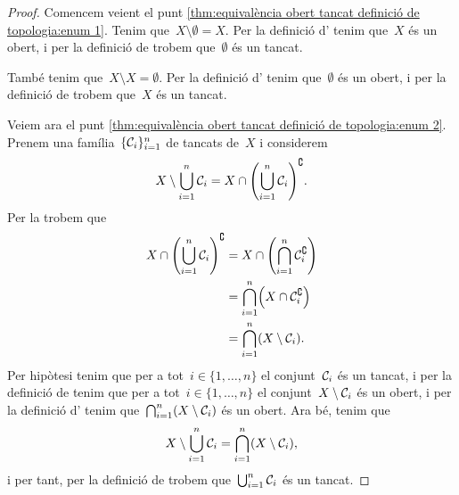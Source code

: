 \documentclass[../../main.tex]{subfiles}
\begin{document}
    \begin{proof}
        Comencem veient el punt \eqref{thm:equivalència obert tancat definició de topologia:enum 1}.
        Tenim que~\(X\setminus\emptyset=X\).
        Per la definició d' tenim que~\(X\) és un obert, i per la definició de  trobem que~\(\emptyset\) és un tancat.

        També tenim que~\(X\setminus X=\emptyset\).
        Per la definició d' tenim que~\(\emptyset\) és un obert, i per la definició de  trobem que~\(X\) és un tancat.

        Veiem ara el punt \eqref{thm:equivalència obert tancat definició de topologia:enum 2}.
        Prenem una família~\(\{\mathcal{C}_{i}\}_{i=1}^{n}\) de tancats de~\(X\) i considerem
        \[
            X\setminus\bigcup_{i=1}^{n}\tancat{C}_{i}=X\cap\left(\bigcup_{i=1}^{n}\tancat{C}_{i}\right)^{\complement}.
        \]
        Per la  trobem que
        \begin{align*}
            X\cap\left(\bigcup_{i=1}^{n}\tancat{C}_{i}\right)^{\complement}&=X\cap\left(\bigcap_{i=1}^{n}\tancat{C}_{i}^{\complement}\right) \\
            &=\bigcap_{i=1}^{n}\left(X\cap\tancat{C}_{i}^{\complement}\right) \\
            &=\bigcap_{i=1}^{n}\left(X\setminus\tancat{C}_{i}\right).
        \end{align*}
        Per hipòtesi tenim que per a tot~\(i\in\{1,\dots,n\}\) el conjunt~\(\mathcal{C}_{i}\) és un tancat, i per la definició de  tenim que per a tot~\(i\in\{1,\dots,n\}\) el conjunt~\(X\setminus\mathcal{C}_{i}\) és un obert, i per la definició d' tenim que~\(\bigcap_{i=1}^{n}\left(X\setminus\tancat{C}_{i}\right)\) és un obert.
        Ara bé, tenim que
        \[
            X\setminus\bigcup_{i=1}^{n}\tancat{C}_{i}=\bigcap_{i=1}^{n}\left(X\setminus\tancat{C}_{i}\right),
        \]
        i per tant, per la definició de  trobem que~\(\bigcup_{i=1}^{n}\mathcal{C}_{i}\) és un tancat.


\end{proof}
\end{document}
